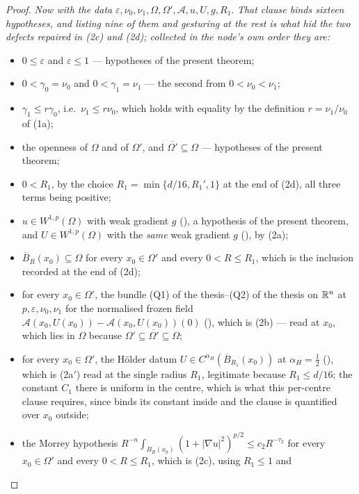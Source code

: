 \begin{proof}
\emph{Now with the data} $\varepsilon,\nu_0,\nu_1,\Omega,\Omega',\mathcal
A,u,U,g,R_1$.  \emph{That clause binds sixteen hypotheses, and
listing nine of them and gesturing at the rest is what hid the two defects
repaired in \textup{(2c)} and \textup{(2d)}; collected in the node's own order
they are:}
\begin{itemize}
\item $0\le\varepsilon$ and $\varepsilon\le1$ --- hypotheses of the present
  theorem;
\item $0<\gamma_0=\nu_0$ and $0<\gamma_1=\nu_1$ --- the second from
  $0<\nu_0<\nu_1$;
\item $\gamma_1\le r\gamma_0$, i.e.\ $\nu_1\le r\nu_0$, which holds with
  equality by the definition $r=\nu_1/\nu_0$ of (1a);
\item the openness of $\Omega$ and of $\Omega'$, and
  $\overline{\Omega'}\subseteq\Omega$ --- hypotheses of the present theorem;
\item $0<R_1$, by the choice $R_1=\min\{d/16,R_1',1\}$ at the end of (2d),
  all three terms being positive;
\item $u\in W^{1,p}(\Omega)$ with weak gradient $g$ (), a
  hypothesis of the present theorem, and $U\in W^{1,p}(\Omega)$ with the
  \emph{same} weak gradient $g$ (), by (2a);
\item $\overline B_R(x_0)\subseteq\Omega$ for every $x_0\in\Omega'$ and every
  $0<R\le R_1$, which is the inclusion recorded at the end of (2d);
\item for every $x_0\in\Omega'$, the bundle
  (Q1) of the thesis--(Q2) of the thesis on $\mathbb{R}^n$ at $p,\varepsilon,\nu_0,\nu_1$ for the
  normalised frozen field
  $\mathcal A(x_0,U(x_0))-\mathcal A(x_0,U(x_0))(0)$
  (), which is (2b) --- read at $x_0$, which lies
  in $\Omega$ because $\Omega'\subseteq\overline{\Omega'}\subseteq\Omega$;
\item for every $x_0\in\Omega'$, the H\"older datum
  $U\in C^{\alpha_H}(\overline B_{R_1}(x_0))$ at $\alpha_H=\tfrac12$
  (), which is (2a$'$) read at the single radius $R_1$,
  legitimate because $R_1\le d/16$; the constant $C_1$ there is uniform in the
  centre, which is what this per-centre clause requires, since
   binds its constant inside and the clause is quantified
  over $x_0$ outside;
\item the Morrey hypothesis
  $R^{-n}\int_{B_R(x_0)}(1+|\nabla u|^2)^{p/2}\le c_2R^{-\tau_2}$ for every
  $x_0\in\Omega'$ and every $0<R\le R_1$, which is (2c), using $R_1\le1$ and

\end{itemize}
\end{proof}
